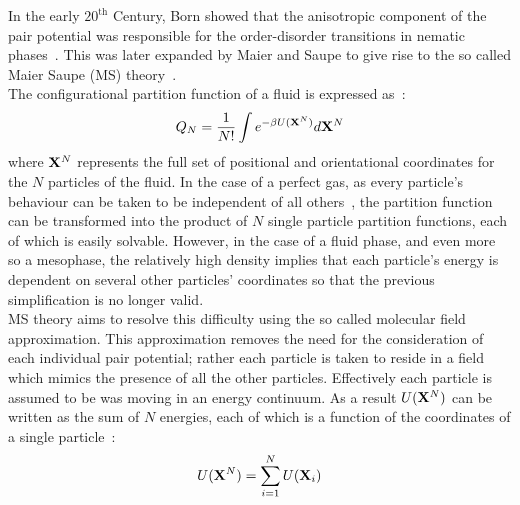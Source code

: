 In the early $20^\mathrm{th}$ Century, Born showed that the anisotropic component of the pair potential
was responsible for the order-disorder transitions in nematic phases~\cite{greenBook}.
This was later expanded by Maier and Saupe to give rise to the so called Maier Saupe (MS)
theory~\cite{MaierSaupe58,MaierSaupe59,MaierSaupe60}.\\
The configurational partition function of a fluid is expressed as~:
\begin{equation}
	Q_N = \frac{1}{N!}\int e^{-\beta U(\mathbf{X}^N) }d\mathbf{X}^N
\end{equation}
where $\mathbf{X}^N$ represents the full set of positional and orientational coordinates for the $N$
particles of the fluid. In the case of a perfect gas, as every particle's behaviour  can be
taken to be independent of all others~\cite{structMatter}, the partition function can be 
transformed into the
product of $N$ single particle partition functions, each of which is easily solvable. However,
in the case
of a fluid phase, and even more so a mesophase, the relatively high density implies that each 
particle's energy is dependent on several other particles' coordinates so that the previous 
simplification is no longer valid.\\
MS theory aims to resolve this difficulty using the so called molecular field
approximation. This approximation removes the need for the consideration of each individual 
pair potential; rather each particle is taken to reside in a field which mimics the presence of
all the other particles. Effectively each particle is assumed to be was moving in an 
energy continuum. As a result $U(\mathbf{X}^N)$ can be written as the sum of $N$ energies, each of 
which is a function of the coordinates of a single particle~:
\begin{equation}
	U(\mathbf{X}^N) = \sum_{i=1}^N U(\mathbf{X}_i)
\end{equation}

